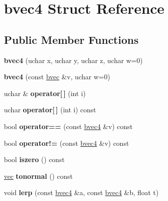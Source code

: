\hypertarget{structbvec4}{}\section{bvec4 Struct Reference}
\label{structbvec4}
\subsection*{Public Member Functions}
\begin{DoxyCompactItemize}
\item 
\mbox{\label{structbvec4_a756d5f0b6c3c27c6450c91920f15f4f3}} 
{\bfseries bvec4} (uchar x, uchar y, uchar z, uchar w=0)
\item 
\mbox{\label{structbvec4_a19af9bb03a719da801b65d215043706d}} 
{\bfseries bvec4} (const \hyperlink{structbvec}{bvec} \&v, uchar w=0)
\item 
\mbox{\label{structbvec4_ac4800bece478ff435350c2d50cbe7a28}} 
uchar \& {\bfseries operator\mbox{[}$\,$\mbox{]}} (int i)
\item 
\mbox{\label{structbvec4_a79373dde0569e2aac5075f9b06d6fec9}} 
uchar {\bfseries operator\mbox{[}$\,$\mbox{]}} (int i) const
\item 
\mbox{\label{structbvec4_a30c8feb7ae725ff2e9d27f32614f9c0d}} 
bool {\bfseries operator==} (const \hyperlink{structbvec4}{bvec4} \&v) const
\item 
\mbox{\label{structbvec4_a383cf1edb547ffffea3b6e23fb480d29}} 
bool {\bfseries operator!=} (const \hyperlink{structbvec4}{bvec4} \&v) const
\item 
\mbox{\label{structbvec4_af0b4f4e608ad7c9b5a1813d3f449907b}} 
bool {\bfseries iszero} () const
\item 
\mbox{\label{structbvec4_a0e243a93d6c2b805ad43d0d2029e0f88}} 
\hyperlink{structvec}{vec} {\bfseries tonormal} () const
\item 
\mbox{\label{structbvec4_abec4e054a61d6dbe309305a2f28e8dec}} 
void {\bfseries lerp} (const \hyperlink{structbvec4}{bvec4} \&a, const \hyperlink{structbvec4}{bvec4} \&b, float t)

\end{DoxyCompactItemize}
